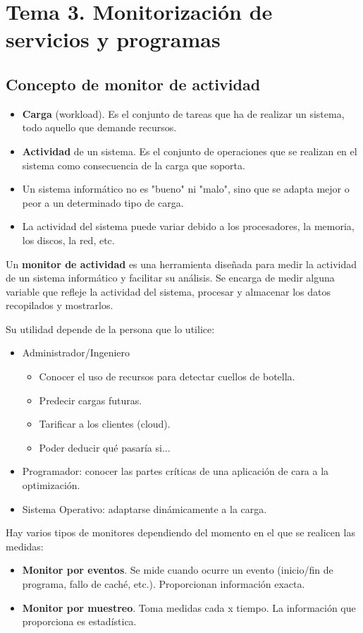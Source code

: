\documentclass[12pt,spanish]{article}
\begin{document}
\section{Tema 3. Monitorización de servicios y programas}

\subsection{Concepto de monitor de actividad}
\begin{itemize}
	\item \textbf{Carga} (workload). Es el conjunto de tareas que ha de realizar un sistema, todo aquello que demande recursos.
	\item \textbf{Actividad} de un sistema. Es el conjunto de operaciones que se realizan en el sistema como consecuencia de la carga que soporta.
	\item Un sistema informático no es "bueno" ni "malo", sino que se adapta mejor o peor a un determinado tipo de carga.
	\item La actividad del sistema puede variar debido a los procesadores, la memoria, los discos, la red, etc.
\end{itemize}

Un \textbf{monitor de actividad} es una herramienta diseñada para medir la actividad de un sistema informático y facilitar su análisis. Se encarga de medir alguna variable que refleje la actividad del sistema, procesar y almacenar los datos recopilados y mostrarlos.

Su utilidad depende de la persona que lo utilice:
\begin{itemize}
	\item Administrador/Ingeniero
	\begin{itemize}
		\item Conocer el uso de recursos para detectar cuellos de botella.
		\item Predecir cargas futuras.
		\item Tarificar a los clientes (cloud).
		\item Poder deducir qué pasaría si...
	\end{itemize}
	\item Programador: conocer las partes críticas de una aplicación de cara a la optimización.
	\item Sistema Operativo: adaptarse dinámicamente a la carga.
\end{itemize}

Hay varios tipos de monitores dependiendo del momento en el que se realicen las medidas:
\begin{itemize}
	\item \textbf{Monitor por eventos}. Se mide cuando ocurre un evento (inicio/fin de programa, fallo de caché, etc.). Proporcionan información exacta.
	\item \textbf{Monitor por muestreo}. Toma medidas cada x tiempo. La información que proporciona es estadística.
\end{itemize}
\end{document}
